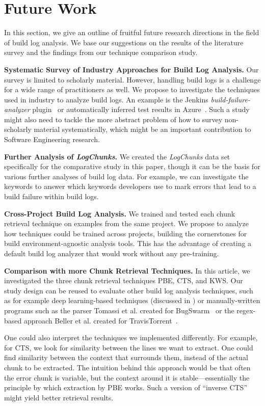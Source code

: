 \section{Future Work}
In this section, we give an outline of fruitful future
research directions in the field of build log analysis.
We base our
suggestions on the results of the literature survey and the
findings from our technique comparison study.

\textbf{Systematic Survey of Industry Approaches for Build
Log Analysis.}	Our survey is limited to scholarly material.
However,
handling build logs is a challenge for a wide range of practitioners
as well.
We propose to investigate the techniques used in industry to
analyze build logs.
An example is the
Jenkins \emph{build-failure-analyzer}
plugin~\cite{jenkins2020failure-analyzer} or automatically inferred
test results in Azure~\cite{azure2020inferred}.
Such a study might
also need to tackle the more abstract problem of how to survey
non-scholarly material systematically, which might be an important
contribution to Software Engineering research.

\textbf{Further Analysis of \emph{LogChunks}.}
We created the
\emph{LogChunks} data set \cite{brandt2020logchunks} specifically for
the comparative
study in this paper, though it can be the basis for various further
analyses of build log data.
For example, we can investigate the keywords to answer which
keywords developers use to mark errors that lead to a build failure
within build logs.

\textbf{Cross-Project Build Log Analysis.}
We trained and
tested each chunk retrieval technique on examples from the same
project.
We propose to analyze how techniques could be trained
across projects, building the cornerstones for build
environment-agnostic analysis tools.
This has the advantage of creating
a default build log analyzer that would work without any pre-training.

\textbf{Comparison with more Chunk Retrieval Techniques.}
In this article, we investigated the three chunk retrieval techniques PBE,
CTS, and
KWS\@.
Our study design can be reused to evaluate other build log
analysis techniques, such as for example deep learning-based techniques
(discussed in ) or manually-written programs such as
the parser Tomassi et al.
created for
BugSwarm~\cite{tomassi2019bugswarm} or the regex-based approach
Beller et al.
created for TravisTorrent~\cite{beller2017oops}.

One could also interpret the techniques we implemented
differently.
For example, for CTS, we look for similarity between the
lines we want to extract.
One could find similarity between the
context that surrounds them, instead of the actual chunk to be
extracted.
The intuition behind this approach would be that often the
error chunk is variable, but the context around it is
stable---essentially the principle by which extraction by PBE
works.
Such a version of ``inverse CTS'' might yield better retrieval
results.

